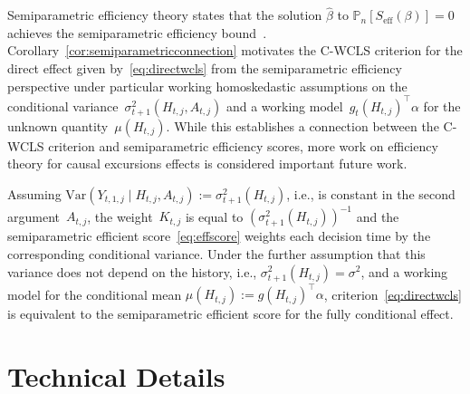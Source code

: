 \documentclass[supplementary, lineno]{biometrika}
\begin{document}
Semiparametric efficiency theory states that the solution $\hat \beta$ to $\mathbb{P}_n \left[ S_{\text{eff}} (\beta) \right] = 0$ achieves the semiparametric efficiency bound~\citep{Newey1990}. 
Corollary~\ref{cor:semiparametricconnection} motivates the C-WCLS criterion for the direct effect given by~\eqref{eq:directwcls} from the semiparametric efficiency perspective under particular working homoskedastic assumptions on the conditional variance~$\sigma^2_{t+1} (H_{t,j}, A_{t,j})$ and a working model~$g_t (H_{t,j})^\top \alpha$ for the unknown quantity~$\mu(H_{t,j})$.  
While this establishes a connection between the C-WCLS criterion and semiparametric efficiency scores, more work on efficiency theory for causal excursions effects is considered important future work.

\begin{corollary}
\label{cor:semiparametricconnection}
Assuming $\text{Var}(Y_{t,1,j} \mid H_{t,j}, A_{t,j}) := \sigma^2_{t+1}(H_{t,j})$, i.e., is constant in the second argument~$A_{t,j}$, the weight~$K_{t,j}$ is equal to $(\sigma^2_{t+1}(H_{t,j}))^{-1}$ and the semiparametric efficient score~\eqref{eq:effscore} weights each decision time by the corresponding conditional variance.  Under the further assumption that this variance does not depend on the history, i.e., $\sigma^2_{t+1} (H_{t,j}) = \sigma^2$, and a working model for the conditional mean $\mu (H_{t,j}) := g (H_{t,j})^\top \alpha$, criterion~\eqref{eq:directwcls} is equivalent to the semiparametric efficient score for the fully conditional effect.
\end{corollary}


\section{Technical Details}
\label{app:techdetails}
\end{document}

